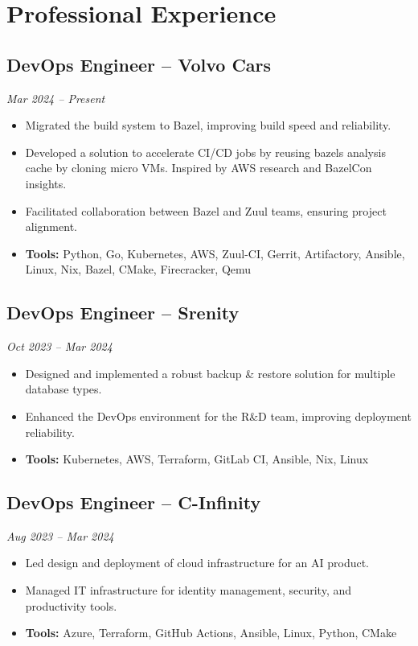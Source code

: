 \documentclass[11pt,a4paper]{article}
\begin{document}
\section{Professional Experience}

\subsection{DevOps Engineer -- Volvo Cars}
\textit{Mar 2024 -- Present}
\begin{itemize}[leftmargin=*]
    \item Migrated the build system to Bazel, improving build speed and reliability.
    \item Developed a solution to accelerate CI/CD jobs by reusing bazels analysis cache by cloning micro VMs. Inspired by AWS research and BazelCon insights.
    \item Facilitated collaboration between Bazel and Zuul teams, ensuring project alignment.
    \item \textbf{Tools:} Python, Go, Kubernetes, AWS, Zuul-CI, Gerrit, Artifactory, Ansible, Linux, Nix, Bazel, CMake, Firecracker, Qemu
\end{itemize}

\subsection{DevOps Engineer -- Srenity}
\textit{Oct 2023 -- Mar 2024}
\begin{itemize}[leftmargin=*]
    \item Designed and implemented a robust backup \& restore solution for multiple database types.
    \item Enhanced the DevOps environment for the R\&D team, improving deployment reliability.
    \item \textbf{Tools:} Kubernetes, AWS, Terraform, GitLab CI, Ansible, Nix, Linux
\end{itemize}

\subsection{DevOps Engineer -- C-Infinity}
\textit{Aug 2023 -- Mar 2024}
\begin{itemize}[leftmargin=*]
    \item Led design and deployment of cloud infrastructure for an AI product.
    \item Managed IT infrastructure for identity management, security, and productivity tools.
    \item \textbf{Tools:} Azure, Terraform, GitHub Actions, Ansible, Linux, Python, CMake
\end{itemize}
\end{document}
